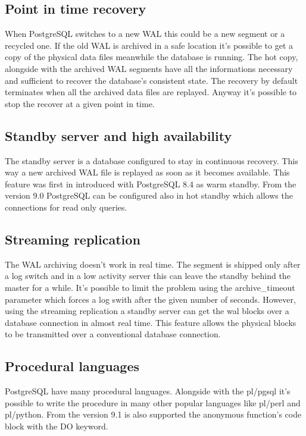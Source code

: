 \subsection{Point in time recovery}
When PostgreSQL switches to a new 
WAL this could be a new segment or a recycled one. If the old WAL is archived in a safe
location it's possible to get a copy of the physical data files meanwhile the database is running. 
The hot copy, alongside with the archived WAL segments have all the informations necessary and 
sufficient to recover the database's consistent state. The recovery by default terminates when all 
the archived data files are replayed. Anyway it's possible to stop the recover at a given point in 
time. 

\subsection{Standby server and high availability}
The standby server is a database configured to 
stay in continuous recovery. This way a new archived WAL file is replayed as soon as it becomes 
available. This feature was first in introduced with  PostgreSQL 8.4 as warm standby. From the version 9.0 PostgreSQL can be configured also in hot standby  
which allows the connections for read only queries.

\subsection{Streaming replication}
The WAL archiving doesn't work in real time. The segment is shipped only after a log switch and 
in a low activity server this can leave the standby behind the master for a while. It's  possible 
to limit the problem using the archive\_timeout parameter which forces a log swith after the given 
number of seconds. However, using the streaming replication a standby 
server can get the wal blocks over a database connection in almost real time. This feature allows 
the physical blocks to be transmitted over a conventional database connection.


\subsection{Procedural languages}
PostgreSQL have many procedural languages. Alongside with the pl/pgsql it's possible to write the 
procedure in many other popular languages like pl/perl and pl/python. From the version 9.1 is also 
supported the anonymous function's code block with the DO keyword.

